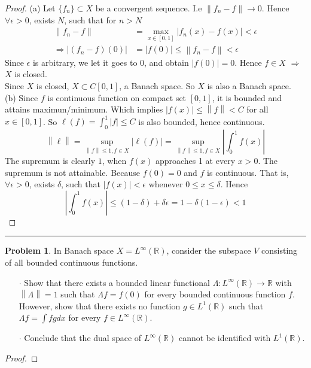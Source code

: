 \documentclass[a4paper, 10pt]{article}
\theoremstyle{definition}
\newtheorem{problem}{Problem}
\theoremstyle{hSol}
\begin{document}
\begin{proof} (a) Let $\{f_n\}\subset X$ be a convergent sequence. I.e $\left\|f_n - f\right\| \to 0$. Hence $\forall \epsilon>0$, exists $N$, such that for $n>N$
\begin{equation}
  \begin{split}
    \left\|f_n - f\right\| &= \max\limits_{x\in [0,1]}|f_n(x)-f(x)| < \epsilon \\
    \Rightarrow |(f_n - f)(0)| &= |f(0)| \leq \left\|f_n-f\right\| < \epsilon
  \end{split}
\end{equation}
Since $\epsilon$ is arbitrary, we let it goes to 0, and obtain $|f(0)|=0$. Hence $f\in X$ $\Rightarrow$ $X$ is closed.  \\
Since $X$ is closed, $X\subset C[0,1]$, a Banach space. So $X$ is also a Banach space.\\
(b) Since $f$ is continuous function on compact set $[0,1]$, it is bounded and attains maximun/minimum. Which implies $|f(x)|\leq \left\|f\right\|<C$ for all $x\in[0,1]$. So $\ell(f) = \int_0^1 |f| \leq C$ is also bounded, hence continuous.
\begin{equation}
  \left\|\ell\right\| = \sup\limits_{\left\|f\right\|\leq 1, f\in X}|\ell(f)| = \sup\limits_{\left\|f\right\|\leq 1, f\in X} \left|\int_0^1 f(x)\right|
\end{equation}
The supremum is clearly $1$, when $f(x)$ approaches 1 at every $x>0$. The supremum is not attainable. Because $f(0)=0$ and $f$ is continuous. That is, $\forall \epsilon>0$, exists $\delta$, such that $|f(x)|<\epsilon$ whenever $0\leq x\leq\delta$. Hence
\begin{equation}
  \left|\int_0^1 f(x)\right| \leq (1-\delta) + \delta \epsilon = 1 - \delta(1- \epsilon) < 1
\end{equation}
\end{proof}


\noindent\rule{16cm}{0.4pt}
\begin{problem} In Banach space $X=L^{\infty}(\mathbb{R})$, consider the subspace $V$ consisting of all bounded continuous functions.
\begin{itemize}
	\item[$\cdot$] Show that there exists a bounded linear functional $\Lambda: L^{\infty}(\mathbb{R})\to \mathbb{R}$ with $\left\|\Lambda\right\|=1$ such that $\Lambda f=f(0)$ for every bounded continuous function $f$. However, show that there exists no function $g\in L^1(\mathbb{R})$ such that $\Lambda f = \int fg dx$ for every $f\in L^{\infty}(\mathbb{R})$. 
	\item[$\cdot$] Conclude that the dual space of $L^{\infty}(\mathbb{R})$ cannot be identified with $L^1(\mathbb{R})$. 
\end{itemize}
\end{problem}
\begin{proof}
\end{proof}
\end{document}
